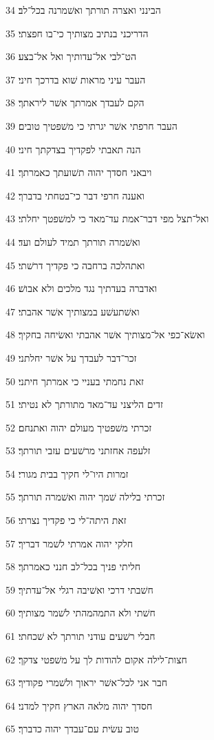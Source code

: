 \par 34 הבינני ואצרה תורתך ואשׁמרנה בכל־לב׃
\par 35 הדריכני בנתיב מצותיך כי־בו חפצתי׃
\par 36 הט־לבי אל־עדותיך ואל אל־בצע׃
\par 37 העבר עיני מראות שׁוא בדרכך חיני׃
\par 38 הקם לעבדך אמרתך אשׁר ליראתך׃
\par 39 העבר חרפתי אשׁר יגרתי כי משׁפטיך טובים׃
\par 40 הנה תאבתי לפקדיך בצדקתך חיני׃
\par 41 ויבאני חסדך יהוה תשׁועתך כאמרתך׃
\par 42 ואענה חרפי דבר כי־בטחתי בדברך׃
\par 43 ואל־תצל מפי דבר־אמת עד־מאד כי למשׁפטך יחלתי׃
\par 44 ואשׁמרה תורתך תמיד לעולם ועד׃
\par 45 ואתהלכה ברחבה כי פקדיך דרשׁתי׃
\par 46 ואדברה בעדתיך נגד מלכים ולא אבושׁ׃
\par 47 ואשׁתעשׁע במצותיך אשׁר אהבתי׃
\par 48 ואשׂא־כפי אל־מצותיך אשׁר אהבתי ואשׂיחה בחקיך׃
\par 49 זכר־דבר לעבדך על אשׁר יחלתני׃
\par 50 זאת נחמתי בעניי כי אמרתך חיתני׃
\par 51 זדים הליצני עד־מאד מתורתך לא נטיתי׃
\par 52 זכרתי משׁפטיך מעולם יהוה ואתנחם׃
\par 53 זלעפה אחזתני מרשׁעים עזבי תורתך׃
\par 54 זמרות היו־לי חקיך בבית מגורי׃
\par 55 זכרתי בלילה שׁמך יהוה ואשׁמרה תורתך׃
\par 56 זאת היתה־לי כי פקדיך נצרתי׃
\par 57 חלקי יהוה אמרתי לשׁמר דבריך׃
\par 58 חליתי פניך בכל־לב חנני כאמרתך׃
\par 59 חשׁבתי דרכי ואשׁיבה רגלי אל־עדתיך׃
\par 60 חשׁתי ולא התמהמהתי לשׁמר מצותיך׃
\par 61 חבלי רשׁעים עודני תורתך לא שׁכחתי׃
\par 62 חצות־לילה אקום להודות לך על משׁפטי צדקך׃
\par 63 חבר אני לכל־אשׁר יראוך ולשׁמרי פקודיך׃
\par 64 חסדך יהוה מלאה הארץ חקיך למדני׃
\par 65 טוב עשׂית עם־עבדך יהוה כדברך׃
